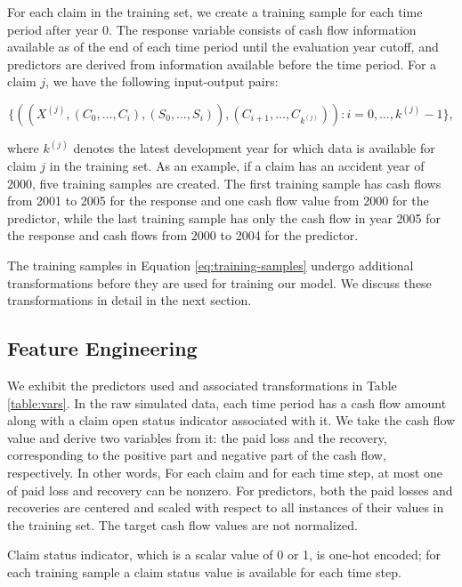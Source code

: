\documentclass{article}
\begin{document}
For each claim in the training set, we create a training sample for each time period after year 0. The response variable consists of cash flow information available as of the end of each time period until the evaluation year cutoff, and predictors are derived from information available before the time period. For a claim $j$, we have the following input-output pairs:

\begin{equation}\label{eq:training-samples}
    \{((X^{(j)}, (C_0, \dots, C_i), (S_0, \dots, S_i)), (C_{i+1}, \dots, C_{k^{(j)}})): i = 0, \dots, k^{(j)} - 1\},
\end{equation}

where $k^{(j)}$ denotes the latest development year for which data is available for claim $j$ in the training set. As an example, if a claim has an accident year of 2000, five training samples are created. The first training sample has cash flows from 2001 to 2005 for the response and one cash flow value from 2000 for the predictor, while the last training sample has only the cash flow in year 2005 for the response and cash flows from 2000 to 2004 for the predictor.

The training samples in Equation \ref{eq:training-samples} undergo additional transformations before they are used for training our model. We discuss these transformations in detail in the next section.

\subsection{Feature Engineering} \label{sec:fe}

We exhibit the predictors used and associated transformations in Table \ref{table:vars}. In the raw simulated data, each time period has a cash flow amount along with a claim open status indicator associated with it. We take the cash flow value and derive two variables from it: the paid loss and the recovery, corresponding to the positive part and negative part of the cash flow, respectively. In other words, For each claim and for each time step, at most one of paid loss and recovery can be nonzero. For predictors, both the paid losses and recoveries are centered and scaled with respect to all instances of their values in the training set. The target cash flow values are not normalized.

Claim status indicator, which is a scalar value of 0 or 1, is one-hot encoded; for each training sample a claim status value is available for each time step.
\end{document}
